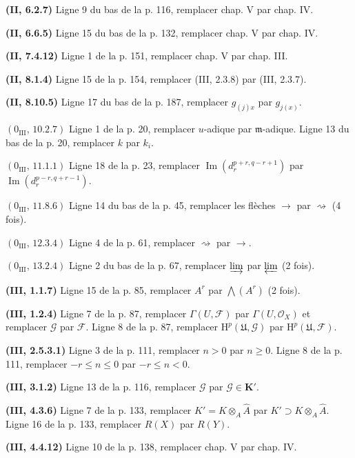 \noindent\textbf{(II, 6.2.7)} Ligne 9 du bas de la p. 116, remplacer chap. V
par chap. IV.

\noindent\textbf{(II, 6.6.5)} Ligne 15 du bas de la p. 132, remplacer chap. V
par chap. IV.

\noindent\textbf{(II, 7.4.12)} Ligne 1 de la p. 151, remplacer chap. V par
chap. III.

\noindent\textbf{(II, 8.1.4)} Ligne 15 de la p. 154, remplacer (III, 2.3.8)
par (III, 2.3.7).

\noindent\textbf{(II, 8.10.5)} Ligne 17 du bas de la p. 187, remplacer
$g_{(j)x}$ par $g_{j(x)}$.

\noindent\textbf{$(0_{\mathrm{III}},\,10.2.7)$} Ligne 1 de la p. 20,
remplacer $u$-adique par $\mathfrak m$-adique. Ligne 13 du bas de la p. 20,
remplacer $k$ par $k_i$.

\noindent\textbf{$(0_{\mathrm{III}},\,11.1.1)$} Ligne 18 de la p. 23,
remplacer $\operatorname{Im}(d_r^{p+r,q-r+1})$ par
$\operatorname{Im}(d_r^{p-r,q+r-1})$.

\noindent\textbf{$(0_{\mathrm{III}},\,11.8.6)$} Ligne 14 du bas de la p. 45,
remplacer les flèches $\to$ par $\rightsquigarrow$ (4 fois).

\noindent\textbf{$(0_{\mathrm{III}},\,12.3.4)$} Ligne 4 de la p. 61,
remplacer $\rightsquigarrow$ par $\to$.

\noindent\textbf{$(0_{\mathrm{III}},\,13.2.4)$} Ligne 2 du bas de la p. 67,
remplacer $\varinjlim$ par $\varprojlim$ (2 fois).

\noindent\textbf{(III, 1.1.7)} Ligne 15 de la p. 85, remplacer $A^r$ par
$\bigwedge(A^r)$ (2 fois).

\noindent\textbf{(III, 1.2.4)} Ligne 7 de la p. 87, remplacer
$\Gamma(U,\mathscr F)$ par $\Gamma(U,\mathscr O_X)$ et remplacer $\mathscr G$
par $\mathscr F$. Ligne 8 de la p. 87, remplacer
$\mathrm H^p(\mathfrak U,\mathscr G)$ par $\mathrm H^p(\mathfrak U,\mathscr F)$.

\noindent\textbf{(III, 2.5.3.1)} Ligne 3 de la p. 111, remplacer $n>0$ par
$n\geq0$. Ligne 8 de la p. 111, remplacer $-r\leq n\leq0$ par
$-r\leq n<0$.

\noindent\textbf{(III, 3.1.2)} Ligne 13 de la p. 116, remplacer $\mathscr G$
par $\mathscr G\in\mathbf K'$.

\noindent\textbf{(III, 4.3.6)} Ligne 7 de la p. 133, remplacer
$K'=K\otimes_A\widehat A$ par $K'\supset K\otimes_A\widehat A$. Ligne 16 de
la p. 133, remplacer $R(X)$ par $R(Y)$.

\noindent\textbf{(III, 4.4.12)} Ligne 10 de la p. 138, remplacer chap. V par
chap. IV.

